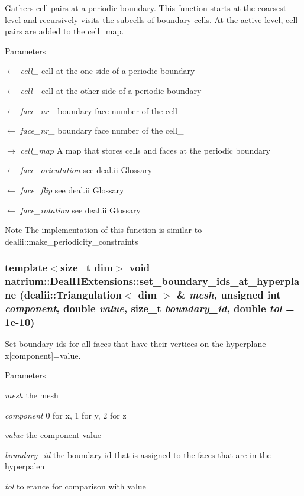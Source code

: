 Gathers cell pairs at a periodic boundary. This function starts at the coarsest level and recursively visits the subcells of boundary cells. At the active level, cell pairs are added to the cell\_\-map. 
\begin{DoxyParams}{Parameters}
\item[\mbox{$\leftarrow$} {\em cell\_\-1}]cell at the one side of a periodic boundary \item[\mbox{$\leftarrow$} {\em cell\_\-2}]cell at the other side of a periodic boundary \item[\mbox{$\leftarrow$} {\em face\_\-nr\_\-1}]boundary face number of the cell\_ \item[\mbox{$\leftarrow$} {\em face\_\-nr\_\-2}]boundary face number of the cell\_ \item[\mbox{$\rightarrow$} {\em cell\_\-map}]A map that stores cells and faces at the periodic boundary \item[\mbox{$\leftarrow$} {\em face\_\-orientation}]see deal.ii Glossary \item[\mbox{$\leftarrow$} {\em face\_\-flip}]see deal.ii Glossary \item[\mbox{$\leftarrow$} {\em face\_\-rotation}]see deal.ii Glossary \end{DoxyParams}
\begin{DoxyNote}{Note}
The implementation of this function is similar to dealii::make\_\-periodicity\_\-constraints 
\end{DoxyNote}
\hypertarget{namespacenatrium_1_1DealIIExtensions_ae126f478c9cfcae855a24b140b5e64f1}{
\subsubsection[{set\_\-boundary\_\-ids\_\-at\_\-hyperplane}]{\setlength{\rightskip}{0pt plus 5cm}template$<$size\_\-t dim$>$ void natrium::DealIIExtensions::set\_\-boundary\_\-ids\_\-at\_\-hyperplane (dealii::Triangulation$<$ dim $>$ \& {\em mesh}, \/  unsigned int {\em component}, \/  double {\em value}, \/  size\_\-t {\em boundary\_\-id}, \/  double {\em tol} = {\ttfamily 1e-\/10})}}
\label{namespacenatrium_1_1DealIIExtensions_ae126f478c9cfcae855a24b140b5e64f1}


Set boundary ids for all faces that have their vertices on the hyperplane x\mbox{[}component\mbox{]}=value. 
\begin{DoxyParams}{Parameters}
\item[{\em mesh}]the mesh \item[{\em component}]0 for x, 1 for y, 2 for z \item[{\em value}]the component value \item[{\em boundary\_\-id}]the boundary id that is assigned to the faces that are in the hyperpalen \item[{\em tol}]tolerance for comparison with value \end{DoxyParams}
